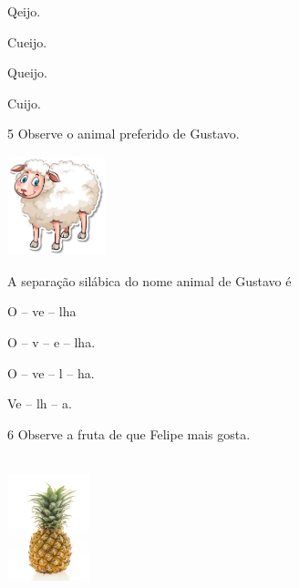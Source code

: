 \begin{escolha}
\item Qeijo.

\item Cueijo.

\item Queijo.

\item Cuijo.
\end{escolha}

\num{5} Observe o animal preferido de Gustavo.

\includegraphics[width=1.11458in,height=1.13889in]{media/image142.jpeg}


A separação silábica do nome animal de Gustavo é

\begin{escolha}
\item O -- ve -- lha

\item O -- v -- e -- lha.

\item O -- ve -- l -- ha.

\item Ve -- lh -- a.
\end{escolha}

\num{6} Observe a fruta de que Felipe mais gosta.

\includegraphics[width=0.94236in,height=1.64306in]{media/image143.jpeg}


